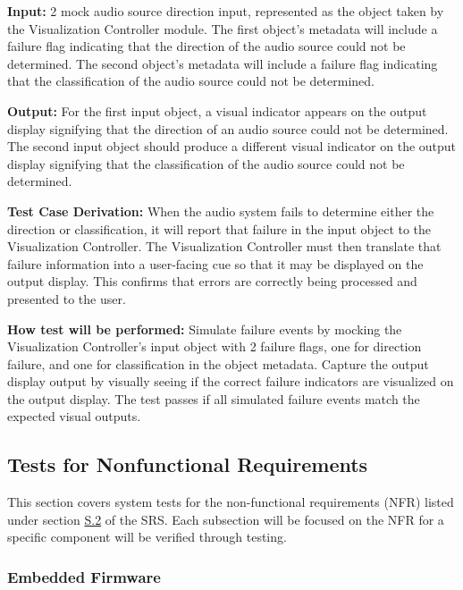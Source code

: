 \documentclass[12pt, titlepage]{article}
\begin{document}
\begin{enumerate}
\textbf{Input:}
2 mock audio source direction input, represented as the object taken by the
Visualization Controller module. The first object's metadata will include a
failure flag indicating that the direction of the audio source could not be
determined. The second object's metadata will include a failure flag indicating
that the classification of the audio source could not be determined.
					
\textbf{Output:}
For the first input object, a visual indicator appears on the output display
signifying that the direction of an audio source could not be determined. The
second input object should produce a different visual indicator on the output
display signifying that the classification of the audio source could not be
determined. 

\textbf{Test Case Derivation:} 
When the audio system fails to determine either the direction or classification,
 it will report that failure in the input object to the Visualization
 Controller. The Visualization Controller must then translate that failure
 information into a user-facing cue so that it may be displayed on the output
 display. This confirms that errors are correctly being processed and presented
 to the user. 
					
\textbf{How test will be performed:}
Simulate failure events by mocking the Visualization Controller's input object
with 2 failure flags, one for direction failure, and one for classification in
the object metadata. Capture the output display output by visually seeing if the
correct failure indicators are visualized on the output display. The test passes
if all simulated failure events match the expected visual outputs.

\end{enumerate}


\subsection{Tests for Nonfunctional Requirements}

This section covers system tests for the non-functional requirements (NFR)
listed under section \hyperref[SRS-sec:S.2]{S.2} of the SRS. Each subsection
will be focused on the NFR for a specific component will be verified through
testing.


\subsubsection{Embedded Firmware}
\end{document}

